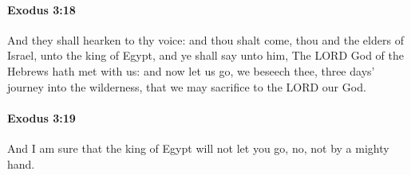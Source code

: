 		\paragraph{Exodus 3:18} %
			\label{EXODUS-3-18}

			And they shall hearken to thy voice: and thou shalt come, thou and the elders of Israel, unto the king of Egypt, and ye shall say unto him, The LORD God of the Hebrews hath met with us: and now let us go, we beseech thee, three days' journey into the wilderness, that we may sacrifice to the LORD our God.


		\paragraph{Exodus 3:19} %
			\label{EXODUS-3-19}

			And I am sure that the king of Egypt will not let you go, no, not by a mighty hand.

